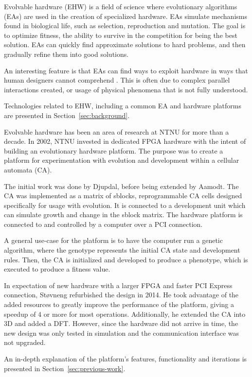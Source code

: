 Evolvable hardware (EHW) is a field of science where evolutionary algorithms (EAs) are used in the creation of specialized hardware.
EAs simulate mechanisms found in biological life, such as selection, reproduction and mutation.
The goal is to optimize fitness, the ability to survive in the competition for being the best solution.
EAs can quickly find approximate solutions to hard problems, and then gradually refine them into good solutions.

An interesting feature is that EAs can find ways to exploit hardware in ways that human designers cannot comprehend \cite{thompson1997evolved}.
This is often due to complex parallel interactions created, or usage of physical phenomena that is not fully understood.

Technologies related to EHW, including a common EA and hardware platforms are presented in Section~\ref{sec:background}.

Evolvable hardware has been an area of research at NTNU for more than a decade.
In 2002, NTNU invested in dedicated FPGA hardware with the intent of building an evolutionary hardware platform.
The purpose was to create a platform for experimentation with evolution and development within a cellular automata (CA).

The initial work was done by Djupdal, before being extended by Aamodt.
The CA was implemented as a matrix of sblocks, reprogrammable CA cells designed specifically for usage with evolution.
It is connected to a development unit which can simulate growth and change in the sblock matrix.
The hardware platform is connected to and controlled by a computer over a PCI connection.

A general use-case for the platform is to have the computer run a genetic algorithm, where the genotype represents the initial CA state and development rules.
Then, the CA is initialized and developed to produce a phenotype, which is executed to produce a fitness value.

In expectation of new hardware with a larger FPGA and faster PCI Express connection, Støvneng refurbished the design in 2014.
He took advantage of the added resources to greatly improve the performance of the platform, giving a speedup of 4 or more for most operations.
Additionally, he extended the CA into 3D and added a DFT.
However, since the hardware did not arrive in time, the new design was only tested in simulation and the communication interface was not upgraded.

An in-depth explanation of the platform's features, functionality and iterations is presented in Section~\ref{sec:previous-work}.

